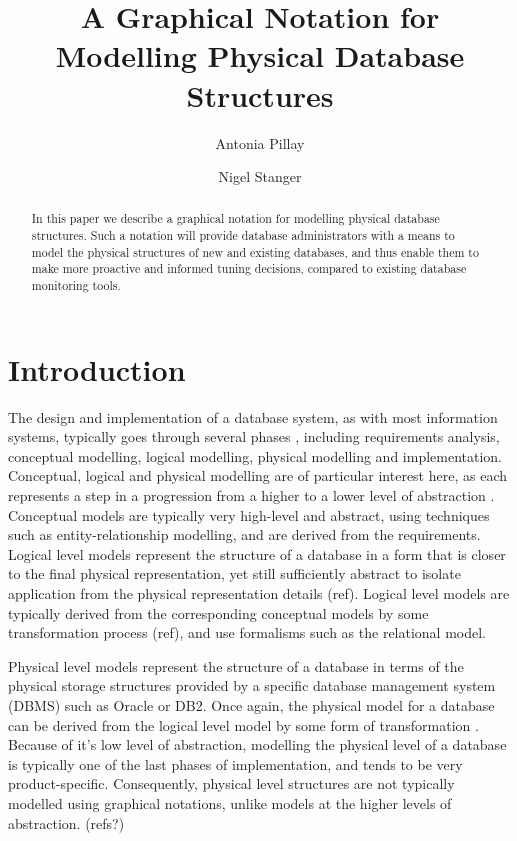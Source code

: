\documentclass{llncs}
\title{A Graphical Notation for Modelling Physical Database Structures}
\author{Antonia Pillay \and Nigel Stanger}
\institute{Department of Information Science, University of Otago, Dunedin, New Zealand \email{nstanger@infoscience.otago.ac.nz}}
\begin{document}
\maketitle

\begin{abstract}
In this paper we describe a graphical notation for modelling physical database structures. Such a notation will provide database administrators with a means to model the physical structures of new and existing databases, and thus enable them to make more proactive and informed tuning decisions, compared to existing database monitoring tools.
\end{abstract}


\section{Introduction}

The design and implementation of a database system, as with most information systems, typically goes through several phases \cite{BeDa-P-2003}, including requirements analysis, conceptual modelling, logical modelling, physical modelling and implementation. Conceptual, logical and physical modelling are of particular interest here, as each represents a step in a progression from a higher to a lower level of abstraction \cite{Tsic-D-1978}. Conceptual models are typically very high-level and abstract, using techniques such as entity-relationship modelling, and are derived from the requirements. Logical level models represent the structure of a database in a form that is closer to the final physical representation, yet still sufficiently abstract to isolate application from the physical representation details (ref). Logical level models are typically derived from the corresponding conceptual models by some transformation process (ref), and use formalisms such as the relational model.

Physical level models represent the structure of a database in terms of the physical storage structures provided by a specific database management system (DBMS) such as Oracle or DB2. Once again, the physical model for a database can be derived from the logical level model by some form of transformation \cite{Bato-DS-1985,Conn-TM-2002}. Because of it's low level of abstraction, modelling the physical level of a database is typically one of the last phases of implementation, and tends to be very product-specific. Consequently, physical level structures are not typically modelled using graphical notations, unlike models at the higher levels of abstraction. (refs?)
\end{document}
